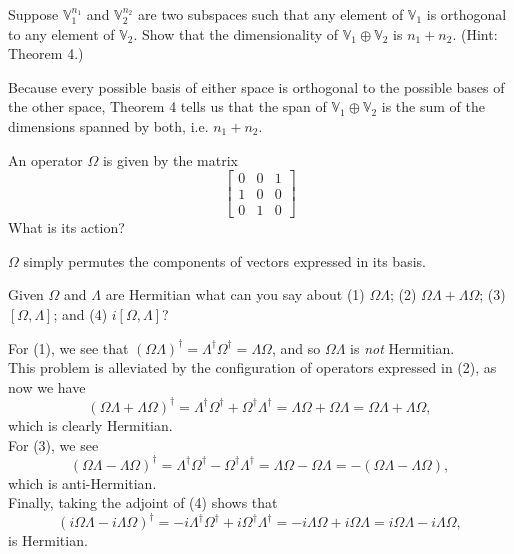 \documentclass[../principles-of-quantum-mechanics.tex]{subfiles}
\begin{document}
\begin{questions}
\question Suppose $\mathbb{V}_1^{n_1}$ and $\mathbb{V}_2^{n_2}$ are two subspaces such that any element of $\mathbb{V}_1$ is orthogonal to any element of $\mathbb{V}_2$. Show that the dimensionality of $\mathbb{V}_1\oplus\mathbb{V}_2$ is $n_1 + n_2$. (Hint: Theorem 4.)

\begin{solution}
	Because every possible basis of either space is orthogonal to the possible bases  of the other space, Theorem 4 tells us that the span of $\mathbb{V}_1\oplus\mathbb{V}_2$ is the sum of the dimensions spanned by both, i.e. $n_1+n_2$.
\end{solution}

\question An operator $\Omega$ is given by the matrix
\[
\begin{bmatrix}
0 & 0 & 1 \\
1 & 0 & 0 \\
0 & 1 & 0
\end{bmatrix}
\]
What is its action?

\begin{solution}
	$\Omega$ simply permutes the components of vectors expressed in its basis.
\end{solution}

\question Given $\Omega$ and $\Lambda$ are Hermitian what can you say about (1) $\Omega\Lambda$; (2) $\Omega\Lambda + \Lambda\Omega$; (3) $[\Omega, \Lambda]$; and (4) $i[\Omega,\Lambda]$?

\begin{solution}
	For (1), we see that $(\Omega\Lambda)^\dagger = \Lambda^\dagger\Omega^\dagger = \Lambda\Omega$, and so $\Omega\Lambda$ is \textit{not} Hermitian. \\
	
	This problem is alleviated by the configuration of operators expressed in (2), as now we have 
	\[
		(\Omega\Lambda + \Lambda\Omega)^\dagger = \Lambda^\dagger\Omega^\dagger + \Omega^\dagger\Lambda^\dagger = \Lambda\Omega + \Omega\Lambda = \Omega\Lambda + \Lambda\Omega,
	\]
	which is clearly Hermitian. \\
	
	For (3), we see
	\[
		(\Omega\Lambda - \Lambda\Omega)^\dagger = \Lambda^\dagger\Omega^\dagger - \Omega^\dagger\Lambda^\dagger = \Lambda\Omega - \Omega\Lambda = -(\Omega\Lambda - \Lambda\Omega),
	\]
	which is anti-Hermitian. \\
	Finally, taking the adjoint of (4) shows that
	\[
		(i\Omega\Lambda - i\Lambda\Omega)^\dagger = -i\Lambda^\dagger\Omega^\dagger + i\Omega^\dagger\Lambda^\dagger = -i\Lambda\Omega + i\Omega\Lambda = i\Omega\Lambda - i\Lambda\Omega,
	\]
	is Hermitian.
\end{solution}


\end{questions}
\end{document}
